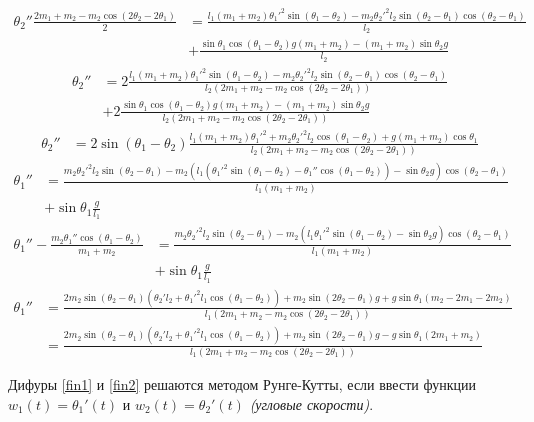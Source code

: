 \documentclass[12pt, a4paper]{article}
\begin{document}
\begin{align*}
    \theta_2''\frac{2m_1 + m_2 - m_2\cos(2\theta_2 - 2\theta_1)}{2} & = \frac{l_1(m_1 + m_2)\theta_1'^2\sin (\theta_1 -\theta_2) - m_2\theta_2'^2 l_2\sin(\theta_2 -\theta_1)\cos(\theta_2 -\theta_1)}{l_2} \\
                                                                    & + \frac{\sin \theta_1 \cos(\theta_1 -\theta_2)g(m_1 + m_2) - (m_1 + m_2)\sin \theta_2 g}{l_2}
\end{align*}
\begin{align*}
    \theta_2'' & = 2\frac{l_1(m_1 + m_2)\theta_1'^2\sin (\theta_1 -\theta_2) - m_2\theta_2'^2 l_2\sin(\theta_2 -\theta_1)\cos(\theta_2 -\theta_1)}{l_2(2m_1 + m_2 - m_2\cos(2\theta_2 - 2\theta_1))} \\
               & + 2\frac{\sin \theta_1 \cos(\theta_1 -\theta_2)g(m_1 + m_2) - (m_1 + m_2)\sin \theta_2 g}{l_2(2m_1 + m_2 - m_2\cos(2\theta_2 - 2\theta_1))}
\end{align*}
\begin{align}
    \theta_2'' & = 2\sin(\theta_1 - \theta_2)\frac{l_1(m_1 + m_2)\theta_1'^2 + m_2\theta_2'^2 l_2\cos(\theta_1 -\theta_2) + g(m_1 + m_2)\cos \theta_1}{l_2(2m_1 + m_2 - m_2\cos(2\theta_2 - 2\theta_1))} \label{fin2}
\end{align}
\begin{align*}
    \theta_1'' & = \frac{m_2 \theta_2'^2 l_2\sin (\theta_2 - \theta_1) - m_2(l_1 (\theta_1'^2 \sin (\theta_1 - \theta_2) - \theta_1'' \cos (\theta_1 - \theta_2)) - \sin \theta_2 g)\cos (\theta_2 - \theta_1)}{l_1(m_1 + m_2)} \\
               & + \sin \theta_1 \frac{g}{l_1}
\end{align*}
\begin{align*}
    \theta_1'' - \frac{m_2 \theta_1'' \cos (\theta_1 - \theta_2)}{m_1 + m_2} & = \frac{m_2 \theta_2'^2 l_2\sin (\theta_2 - \theta_1) - m_2(l_1 \theta_1'^2 \sin (\theta_1 - \theta_2) - \sin \theta_2 g)\cos (\theta_2 - \theta_1)}{l_1(m_1 + m_2)} \\
                                                                             & + \sin \theta_1 \frac{g}{l_1}
\end{align*}
\begin{align}
    \theta_1'' & = \frac{2m_2 \sin (\theta_2 - \theta_1)(\theta_2' l_2 + \theta_1'^2 l_1 \cos(\theta_1 - \theta_2)) + m_2\sin (2\theta_2 - \theta_1)g + g \sin \theta_1 (m_2 - 2m_1 - 2m_2)}{l_1(2m_1 + m_2 - m_2\cos (2\theta_2 - 2\theta_1))} \nonumber \\
               & = \frac{2m_2 \sin (\theta_2 - \theta_1)(\theta_2' l_2 + \theta_1'^2 l_1 \cos(\theta_1 - \theta_2)) + m_2\sin (2\theta_2 - \theta_1)g - g \sin \theta_1 (2m_1 + m_2)}{l_1(2m_1 + m_2 - m_2\cos (2\theta_2 - 2\theta_1))} \label{fin1}
\end{align}

Дифуры \eqref{fin1} и \eqref{fin2} решаются методом Рунге-Кутты, если ввести функции \(w_1(t) = \theta_1'(t)\) и \(w_2(t) = \theta_2'(t)\) \textit{(угловые скорости)}.
\end{document}

